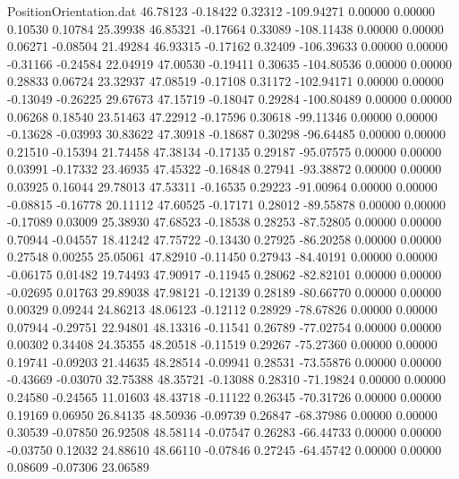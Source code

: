 \begin{filecontents}{PositionOrientation.dat}
  46.78123   -0.18422    0.32312  -109.94271    0.00000    0.00000    0.10530    0.10784   25.39938
  46.85321   -0.17664    0.33089  -108.11438    0.00000    0.00000    0.06271   -0.08504   21.49284
  46.93315   -0.17162    0.32409  -106.39633    0.00000    0.00000   -0.31166   -0.24584   22.04919
  47.00530   -0.19411    0.30635  -104.80536    0.00000    0.00000    0.28833    0.06724   23.32937
  47.08519   -0.17108    0.31172  -102.94171    0.00000    0.00000   -0.13049   -0.26225   29.67673
  47.15719   -0.18047    0.29284  -100.80489    0.00000    0.00000    0.06268    0.18540   23.51463
  47.22912   -0.17596    0.30618   -99.11346    0.00000    0.00000   -0.13628   -0.03993   30.83622
  47.30918   -0.18687    0.30298   -96.64485    0.00000    0.00000    0.21510   -0.15394   21.74458
  47.38134   -0.17135    0.29187   -95.07575    0.00000    0.00000    0.03991   -0.17332   23.46935
  47.45322   -0.16848    0.27941   -93.38872    0.00000    0.00000    0.03925    0.16044   29.78013
  47.53311   -0.16535    0.29223   -91.00964    0.00000    0.00000   -0.08815   -0.16778   20.11112
  47.60525   -0.17171    0.28012   -89.55878    0.00000    0.00000   -0.17089    0.03009   25.38930
  47.68523   -0.18538    0.28253   -87.52805    0.00000    0.00000    0.70944   -0.04557   18.41242
  47.75722   -0.13430    0.27925   -86.20258    0.00000    0.00000    0.27548    0.00255   25.05061
  47.82910   -0.11450    0.27943   -84.40191    0.00000    0.00000   -0.06175    0.01482   19.74493
  47.90917   -0.11945    0.28062   -82.82101    0.00000    0.00000   -0.02695    0.01763   29.89038
  47.98121   -0.12139    0.28189   -80.66770    0.00000    0.00000    0.00329    0.09244   24.86213
  48.06123   -0.12112    0.28929   -78.67826    0.00000    0.00000    0.07944   -0.29751   22.94801
  48.13316   -0.11541    0.26789   -77.02754    0.00000    0.00000    0.00302    0.34408   24.35355
  48.20518   -0.11519    0.29267   -75.27360    0.00000    0.00000    0.19741   -0.09203   21.44635
  48.28514   -0.09941    0.28531   -73.55876    0.00000    0.00000   -0.43669   -0.03070   32.75388
  48.35721   -0.13088    0.28310   -71.19824    0.00000    0.00000    0.24580   -0.24565   11.01603
  48.43718   -0.11122    0.26345   -70.31726    0.00000    0.00000    0.19169    0.06950   26.84135
  48.50936   -0.09739    0.26847   -68.37986    0.00000    0.00000    0.30539   -0.07850   26.92508
  48.58114   -0.07547    0.26283   -66.44733    0.00000    0.00000   -0.03750    0.12032   24.88610
  48.66110   -0.07846    0.27245   -64.45742    0.00000    0.00000    0.08609   -0.07306   23.06589

\end{filecontents}
